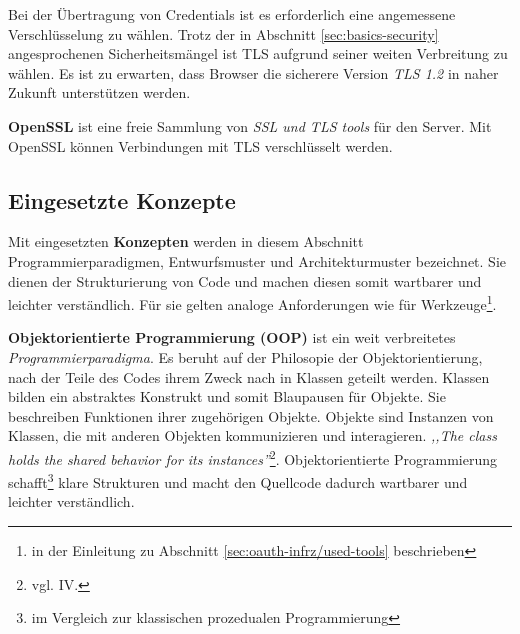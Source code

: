 \documentclass[12pt,a4paper,pointednumbers,abstracton]{scrartcl}
\begin{document}
Bei der Übertragung von Credentials ist es erforderlich eine angemessene Verschlüsselung zu wählen.
Trotz der in Abschnitt \ref{sec:basics-security} angesprochenen Sicherheitsmängel ist TLS aufgrund seiner weiten Verbreitung zu wählen.
Es ist zu erwarten, dass Browser die sicherere Version \emph{TLS 1.2} in naher Zukunft unterstützen werden.

\textbf{OpenSSL} ist eine freie Sammlung von \emph{SSL und TLS tools} für den Server.
Mit OpenSSL können Verbindungen mit TLS verschlüsselt werden.



\subsection{Eingesetzte Konzepte}
\label{sec:oauth-infrz/concepts}

Mit eingesetzten \textbf{Konzepten} werden in diesem Abschnitt Programmierparadigmen, Entwurfsmuster und Architekturmuster bezeichnet.
Sie dienen der Strukturierung von Code und machen diesen somit wartbarer und leichter verständlich.
Für sie gelten analoge Anforderungen wie für Werkzeuge\footnote{in der Einleitung zu Abschnitt \ref{sec:oauth-infrz/used-tools} beschrieben}.

\textbf{Objektorientierte Programmierung (OOP)} ist ein weit verbreitetes \emph{Programmierparadigma}.
Es beruht auf der Philosopie der Objektorientierung, nach der Teile des Codes ihrem Zweck nach in Klassen geteilt werden.
Klassen bilden ein abstraktes Konstrukt und somit Blaupausen für Objekte. Sie beschreiben Funktionen ihrer zugehörigen Objekte.
Objekte sind Instanzen von Klassen, die mit anderen Objekten kommunizieren und interagieren.
\emph{,,The class holds the shared behavior for its instances''}\footnote{vgl. \cite{Kay93} IV.}.
Objektorientierte Programmierung schafft\footnote{im Vergleich zur klassischen prozedualen Programmierung} klare Strukturen und macht den Quellcode dadurch wartbarer und leichter verständlich.
\end{document}
